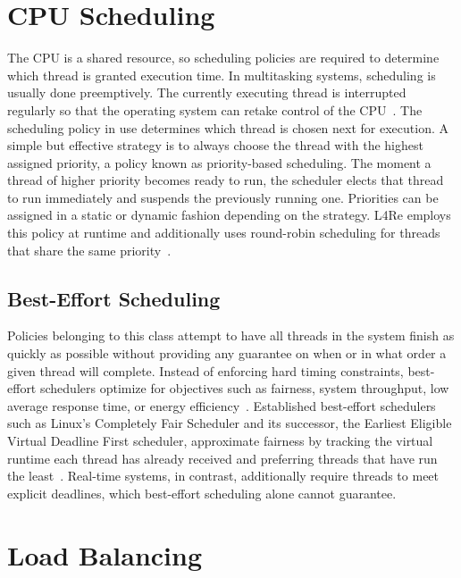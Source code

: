 \section{CPU Scheduling}

The CPU is a shared resource, so scheduling policies are required to determine which thread is granted execution time.
In multitasking systems, scheduling is usually done preemptively.
The currently executing thread is interrupted regularly so that the operating system can retake control of the CPU~\cite{ostep}.
The scheduling policy in use determines which thread is chosen next for execution.
A simple but effective strategy is to always choose the thread with the highest assigned priority, a policy known as priority-based scheduling.
The moment a thread of higher priority becomes ready to run, the scheduler elects that thread to run immediately and suspends the previously running one.
Priorities can be assigned in a static or dynamic fashion depending on the strategy.
L4Re employs this policy at runtime and additionally uses round-robin scheduling for threads that share the same priority~\cite{rr-scheduling}.

\subsection{Best-Effort Scheduling}
\label{sec:best-effort}

Policies belonging to this class attempt to have all threads in the system finish as quickly as possible without providing any guarantee on when or in what order a given thread will complete.
Instead of enforcing hard timing constraints, best-effort schedulers optimize for objectives such as fairness, system throughput, low average response time, or energy efficiency~\cite{ostep}.
Established best-effort schedulers such as Linux's Completely Fair Scheduler and its successor, the Earliest Eligible Virtual Deadline First scheduler, approximate fairness by tracking the virtual runtime each thread has already received and preferring threads that have run the least~\cite{cfs, eevdf}.
Real-time systems, in contrast, additionally require threads to meet explicit deadlines, which best-effort scheduling alone cannot guarantee.

\section{Load Balancing}

